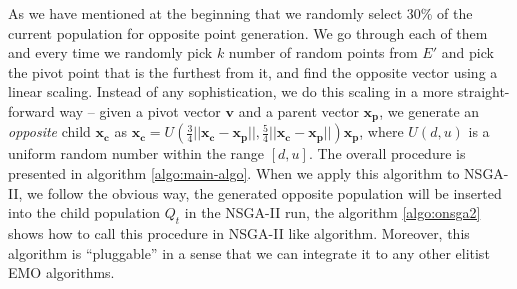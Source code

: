 \documentclass[journal]{IEEEtran}
\begin{document}

As we have mentioned at the beginning that we randomly select 30\% of the current population for opposite point generation. We go through each of them and every time we randomly pick \(k\) number of random points from \(E'\) and pick the pivot point that is the furthest from it, and find the opposite vector using a linear scaling. Instead of any sophistication, we do this scaling in a more straight-forward way -- given a pivot vector \(\mathbf{v}\) and a parent vector \(\mathbf{x_p}\), we generate an \textit{opposite} child \(\mathbf{x_c}\) as \(\mathbf{x_c} = U(\frac{3}{4}||\mathbf{x_c} - \mathbf{x_p}||,\frac{5}{4}||\mathbf{x_c} - \mathbf{x_p}||)\mathbf{x_p}\), where \(U(d,u)\) is a uniform random number within the range \([d,u]\). The overall procedure is presented in algorithm \ref{algo:main-algo}. When we apply this algorithm to NSGA-II, we follow the obvious way, the generated opposite population will be inserted into the child population \(Q_t\) in the NSGA-II run, the algorithm \ref{algo:onsga2} shows how to call this procedure in NSGA-II like algorithm. Moreover, this algorithm is ``pluggable'' in a sense that we can integrate it to any other elitist EMO algorithms.
\end{document}

